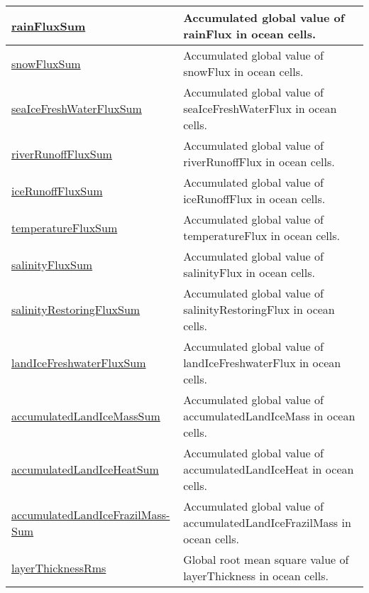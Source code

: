 {\begin{center}
\begin{longtable}{| p{2.0in} | p{4.0in} |}
    \hline
    \hyperref[subsec:var_sec_globalStatsAM_rainFluxSum]{rainFluxSum} & Accumulated global value of rainFlux in ocean cells. \\
    \hline
    \hyperref[subsec:var_sec_globalStatsAM_snowFluxSum]{snowFluxSum} & Accumulated global value of snowFlux in ocean cells. \\
    \hline
    \hyperref[subsec:var_sec_globalStatsAM_seaIceFreshWaterFluxSum]{seaIceFreshWaterFluxSum} & Accumulated global value of seaIceFreshWaterFlux in ocean cells. \\
    \hline
    \hyperref[subsec:var_sec_globalStatsAM_riverRunoffFluxSum]{riverRunoffFluxSum} & Accumulated global value of riverRunoffFlux in ocean cells. \\
    \hline
    \hyperref[subsec:var_sec_globalStatsAM_iceRunoffFluxSum]{iceRunoffFluxSum} & Accumulated global value of iceRunoffFlux in ocean cells. \\
    \hline
    \hyperref[subsec:var_sec_globalStatsAM_temperatureFluxSum]{temperatureFluxSum} & Accumulated global value of temperatureFlux in ocean cells. \\
    \hline
    \hyperref[subsec:var_sec_globalStatsAM_salinityFluxSum]{salinityFluxSum} & Accumulated global value of salinityFlux in ocean cells. \\
    \hline
    \hyperref[subsec:var_sec_globalStatsAM_salinityRestoringFluxSum]{salinityRestoringFluxSum} & Accumulated global value of salinityRestoringFlux in ocean cells. \\
    \hline
    \hyperref[subsec:var_sec_globalStatsAM_landIceFreshwaterFluxSum]{landIceFreshwaterFluxSum} & Accumulated global value of landIceFreshwaterFlux in ocean cells. \\
    \hline
    \hyperref[subsec:var_sec_globalStatsAM_accumulatedLandIceMassSum]{accumulatedLandIceMassSum} & Accumulated global value of accumulatedLandIceMass in ocean cells. \\
    \hline
    \hyperref[subsec:var_sec_globalStatsAM_accumulatedLandIceHeatSum]{accumulatedLandIceHeatSum} & Accumulated global value of accumulatedLandIceHeat in ocean cells. \\
    \hline
    \hyperref[subsec:var_sec_globalStatsAM_accumulatedLandIceFrazilMassSum]{accumulatedLandIceFrazilMass-}\hyperref[subsec:var_sec_globalStatsAM_accumulatedLandIceFrazilMassSum]{Sum}  & Accumulated global value of accumulatedLandIceFrazilMass in ocean cells. \\
    \hline
    \hyperref[subsec:var_sec_globalStatsAM_layerThicknessRms]{layerThicknessRms} & Global root mean square value of layerThickness in ocean cells. \\

\end{longtable}
\end{center}}
